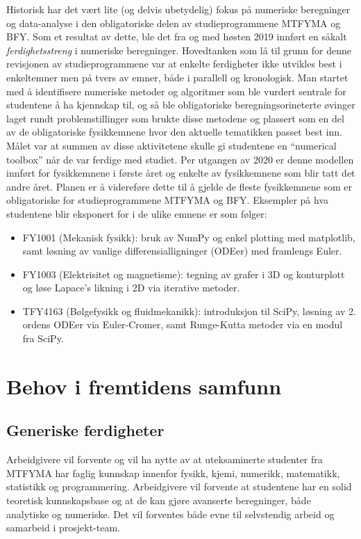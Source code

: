 \documentclass{article}
\begin{document}
Historisk har det vært lite (og delvis ubetydelig) fokus på numeriske beregninger og data-analyse i den obligatoriske delen av studieprogrammene MTFYMA og BFY. Som et resultat av dette, ble det fra og med høsten 2019 innført en såkalt \emph{ferdighetsstreng} i numeriske beregninger. Hovedtanken som lå til grunn for denne revisjonen av studieprogrammene var at enkelte ferdigheter ikke utvikles best i enkeltemner men på tvers av emner, både i parallell og kronologisk. Man startet med å identifisere numeriske metoder og algoritmer som ble vurdert sentrale for studentene å ha kjennskap til, og så ble obligatoriske beregningsorineterte øvinger laget rundt problemstillinger som brukte disse metodene og plassert som en del av de obligatoriske fysikkemnene hvor den aktuelle tematikken passet best inn. Målet var at summen av disse aktivitetene skulle gi studentene en ``numerical toolbox'' når de var ferdige med studiet. Per utgangen av 2020 er denne modellen innført for fysikkemnene i første året og enkelte av fysikkemnene som blir tatt det andre året. Planen er å videreføre dette til å gjelde de fleste fysikkemnene som er obligatoriske for studieprogrammene MTFYMA og BFY. Eksempler på hva studentene blir eksponert for i de ulike emnene er som følger:
\begin{itemize}
  \item FY1001 (Mekanisk fysikk): bruk av NumPy og enkel plotting med matplotlib, samt løsning av vanlige differensialligninger (ODEer) med framlengs Euler.
  \item FY1003 (Elektrisitet og magnetisme): tegning av grafer i 3D og konturplott og løse Lapace's likning i 2D via iterative metoder.
  \item TFY4163 (Bølgefysikk og fluidmekanikk): introduksjon til SciPy, løsning av 2. ordens ODEer via Euler-Cromer, samt Runge-Kutta metoder via en modul fra SciPy.
\end{itemize}

\clearpage
\section{Behov i fremtidens samfunn}
\subsection{Generiske ferdigheter}
\label{sec:behov}
Arbeidgivere vil forvente og vil ha nytte av at uteksaminerte studenter fra MTFYMA har faglig kunnskap innenfor fysikk, kjemi, numerikk, matematikk, statistikk og programmering.
Arbeidgivere vil forvente at studentene har en solid teoretisk kunnskapsbase og at de kan gjøre avanserte beregninger, både analytiske og numeriske.
Det vil forventes både evne til selvstendig arbeid og samarbeid i prosjekt-team.
\end{document}
